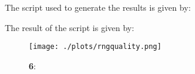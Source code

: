 
The script used to generate the results is given by:



The result of the script is given by:



\begin{figure}[h!]
  \centering
  \texttt{[image: ./plots/rngquality.png]}
  \caption{\textbf{6}: }
  \label{fig:rngquality}
\end{figure}